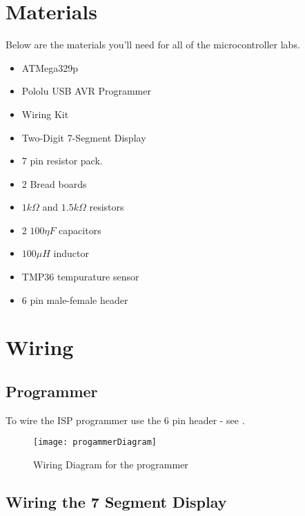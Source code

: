\documentclass[main.tex]{subfile}
\begin{document}
\section{Materials}
\label{sub:materials}

Below are the materials you'll need for all of the microcontroller labs.

\begin{itemize}
	\item ATMega329p
	\item Pololu USB AVR Programmer
	\item Wiring Kit
	\item Two-Digit 7-Segment Display
	\item 7 pin resistor pack.
	\item 2 Bread boards
	\item $1k \Omega$ and $1.5k \Omega$ resistors
	\item 2 $100 \eta F$ capacitors
	\item $100 \mu H$ inductor
	\item TMP36 tempurature sensor
	\item 6 pin male-female header
\end{itemize}


\section{Wiring} 
\label{sec:wiring}

\subsection{Programmer}
\label{sub:programmer}

To wire the ISP programmer use the 6 pin header - see .

\begin{figure}[H]
	\begin{center}
		\texttt{[image: progammerDiagram]}
	\end{center}
	\caption{Wiring Diagram for the programmer}
	\label{fig:programmerDia}
\end{figure}


\subsection{Wiring the 7 Segment Display}
\label{sub:wiring_the_7_segment_display}
\end{document}
